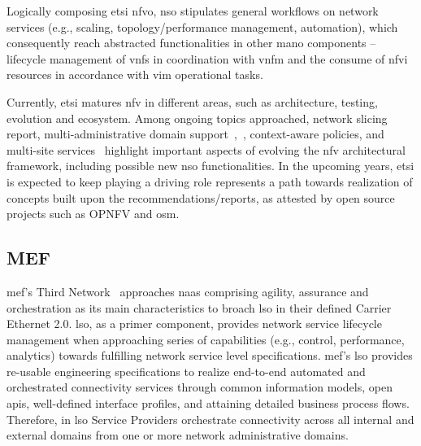 Logically composing \gls{etsi} \gls{nfvo}, \gls{nso} stipulates general workflows on network services (e.g., scaling, topology/performance management, automation), which consequently reach abstracted functionalities in other \gls{mano} components -- lifecycle management of \glspl{vnf} in coordination with \gls{vnfm} and the consume of \gls{nfvi} resources in accordance with \gls{vim} operational tasks.

Currently, \gls{etsi} matures \gls{nfv} in different areas, such as architecture, testing, evolution and ecosystem. Among ongoing topics approached, network slicing report, multi-administrative domain support~\cite{ETSIIndustrySpecificationGroupISGNFV2014NetworkOptions},~\cite{ETSIGRDomains}, context-aware policies, and multi-site services~\cite{ETSIISGNFV2018} highlight important aspects of evolving the \gls{nfv} architectural framework, including possible new \gls{nso} functionalities. 
In the upcoming years, \gls{etsi} is expected to keep playing a driving role represents a path towards realization of concepts built upon the recommendations/reports, as attested by open source projects such as OPNFV and \gls{osm}.


\subsection{MEF}
\acrfull{mef}'s Third Network~\cite{MEF:Third:2015} approaches \gls{naas} comprising agility, assurance and orchestration as its main characteristics to broach \gls{lso} in their defined Carrier Ethernet 2.0. \gls{lso}, as a primer component, provides network service lifecycle management when approaching series of capabilities (e.g., control, performance, analytics) towards fulfilling network service level specifications. \acrfull{mef}'s \gls{lso} provides re-usable engineering specifications to realize end-to-end automated and orchestrated connectivity services through common information models, open \glspl{api}, well-defined interface profiles, and attaining detailed business process flows. Therefore, in \gls{lso} Service Providers orchestrate connectivity across all internal and external domains from one or more network administrative domains. 

